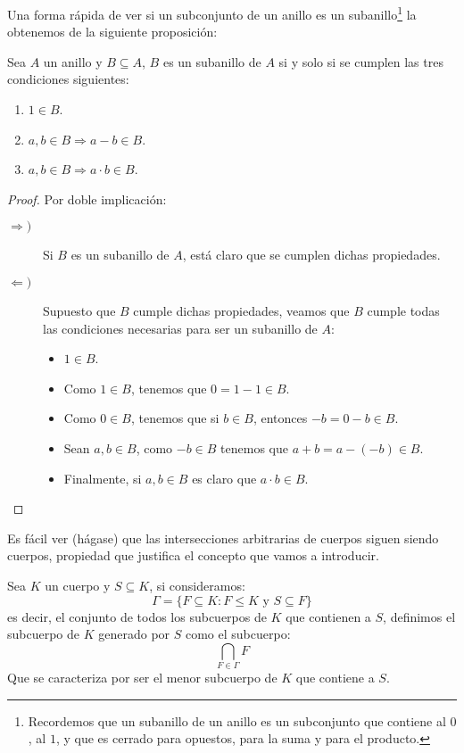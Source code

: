 \noindent
Una forma rápida de ver si un subconjunto de un anillo es un subanillo\footnote{Recordemos que un subanillo de un anillo es un subconjunto que contiene al $0$, al $1$, y que es cerrado para opuestos, para la suma y para el producto.} la obtenemos de la siguiente proposición:

\begin{prop}
    Sea $A$ un anillo y $B\subseteq A$, $B$ es un subanillo de $A$ si y solo si se cumplen las tres condiciones siguientes:
    \begin{enumerate}
        \item $1\in B$.
        \item $a,b\in B \Longrightarrow a-b\in B$.
        \item $a,b\in B \Longrightarrow a\cdot b\in B$.
    \end{enumerate}
    \begin{proof}
        Por doble implicación:
        \begin{description}
            \item [$\Longrightarrow )$] Si $B$ es un subanillo de $A$, está claro que se cumplen dichas propiedades.
            \item [$\Longleftarrow )$] Supuesto que $B$ cumple dichas propiedades, veamos que $B$ cumple todas las condiciones necesarias para ser un subanillo de $A$:
                \begin{itemize}
                    \item $1\in B$.
                    \item Como $1\in B$, tenemos que $0 = 1 -1 \in B$.
                    \item Como $0\in B$, tenemos que si $b\in B$, entonces $-b = 0-b\in B$.
                    \item Sean $a,b\in B$, como $-b\in B$ tenemos que $a+b = a-(-b)\in B$.
                    \item Finalmente, si $a,b\in B$ es claro que $a\cdot b\in B$.
                \end{itemize}
        \end{description}
    \end{proof}
\end{prop}

\noindent
Es fácil ver (hágase) que las intersecciones arbitrarias de cuerpos siguen siendo cuerpos, propiedad que justifica el concepto que vamos a introducir.

\begin{definicion}
    Sea $K$ un cuerpo y $S\subseteq K$, si consideramos:
    \begin{equation*}
        \Gamma = \{F\subseteq K : F\leq K \text{\ y\ } S\subseteq F\}
    \end{equation*}
    es decir, el conjunto de todos los subcuerpos de $K$ que contienen a $S$, definimos el subcuerpo de $K$ generado por $S$ como el subcuerpo:
    \begin{equation*}
        \bigcap_{F\in \Gamma} F
    \end{equation*}
    Que se caracteriza por ser el menor subcuerpo de $K$ que contiene a $S$.
\end{definicion}

